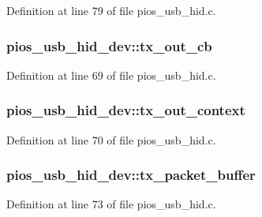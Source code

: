 Definition at line 79 of file pios\-\_\-usb\-\_\-hid.\-c.

\hypertarget{group___p_i_o_s___u_s_b___h_i_d_ga04c76a0e0e88338371d2f12cd9749309}{
\subsubsection[{tx\-\_\-out\-\_\-cb}]{ pios\-\_\-usb\-\_\-hid\-\_\-dev\-::tx\-\_\-out\-\_\-cb}}\label{group___p_i_o_s___u_s_b___h_i_d_ga04c76a0e0e88338371d2f12cd9749309}


Definition at line 69 of file pios\-\_\-usb\-\_\-hid.\-c.

\hypertarget{group___p_i_o_s___u_s_b___h_i_d_ga1a95563a3fb1aee312d7793c77f81bf2}{
\subsubsection[{tx\-\_\-out\-\_\-context}]{ pios\-\_\-usb\-\_\-hid\-\_\-dev\-::tx\-\_\-out\-\_\-context}}\label{group___p_i_o_s___u_s_b___h_i_d_ga1a95563a3fb1aee312d7793c77f81bf2}


Definition at line 70 of file pios\-\_\-usb\-\_\-hid.\-c.

\hypertarget{group___p_i_o_s___u_s_b___h_i_d_gad6c7b8ecc0fe215e9d18d6d3281977c6}{
\subsubsection[{tx\-\_\-packet\-\_\-buffer}]{ pios\-\_\-usb\-\_\-hid\-\_\-dev\-::tx\-\_\-packet\-\_\-buffer}}\label{group___p_i_o_s___u_s_b___h_i_d_gad6c7b8ecc0fe215e9d18d6d3281977c6}


Definition at line 73 of file pios\-\_\-usb\-\_\-hid.\-c.

